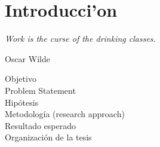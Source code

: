 \chapter{Introducci'on}

\textit{Work is the curse of the drinking classes.}
\begin{flushright}
 Oscar Wilde
 \end{flushright}

\vspace{10 pt}

Objetivo\\

Problem Statement\\

Hip\'otesis\\

Metodolog\'ia (research approach)\\

Resultado esperado\\

Organizaci\'on de la tesis\\


